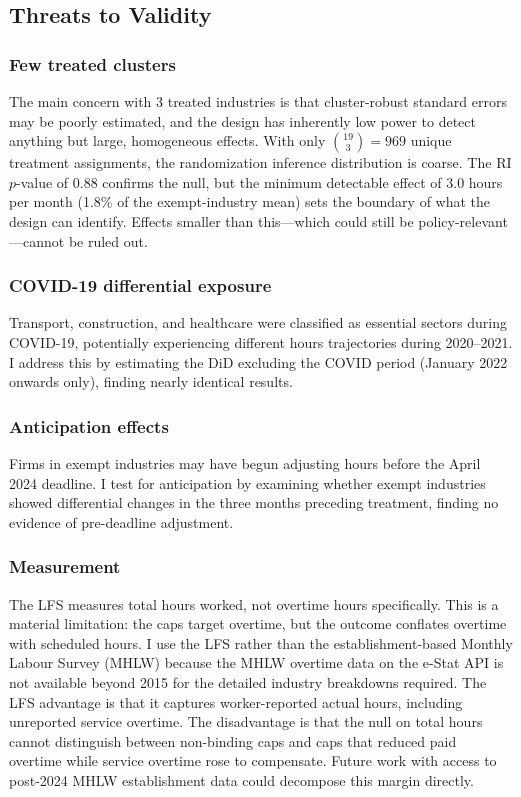 \documentclass[12pt]{article}
\begin{document}
\subsection{Threats to Validity}

\subsubsection*{Few treated clusters} The main concern with 3 treated industries is that cluster-robust standard errors may be poorly estimated, and the design has inherently low power to detect anything but large, homogeneous effects. With only $\binom{19}{3} = 969$ unique treatment assignments, the randomization inference distribution is coarse. The RI $p$-value of 0.88 confirms the null, but the minimum detectable effect of 3.0 hours per month (1.8\% of the exempt-industry mean) sets the boundary of what the design can identify. Effects smaller than this---which could still be policy-relevant---cannot be ruled out.

\subsubsection*{COVID-19 differential exposure} Transport, construction, and healthcare were classified as essential sectors during COVID-19, potentially experiencing different hours trajectories during 2020--2021. I address this by estimating the DiD excluding the COVID period (January 2022 onwards only), finding nearly identical results.

\subsubsection*{Anticipation effects} Firms in exempt industries may have begun adjusting hours before the April 2024 deadline. I test for anticipation by examining whether exempt industries showed differential changes in the three months preceding treatment, finding no evidence of pre-deadline adjustment.

\subsubsection*{Measurement} The LFS measures total hours worked, not overtime hours specifically. This is a material limitation: the caps target overtime, but the outcome conflates overtime with scheduled hours. I use the LFS rather than the establishment-based Monthly Labour Survey (MHLW) because the MHLW overtime data on the e-Stat API is not available beyond 2015 for the detailed industry breakdowns required. The LFS advantage is that it captures worker-reported actual hours, including unreported service overtime. The disadvantage is that the null on total hours cannot distinguish between non-binding caps and caps that reduced paid overtime while service overtime rose to compensate. Future work with access to post-2024 MHLW establishment data could decompose this margin directly.
\end{document}
